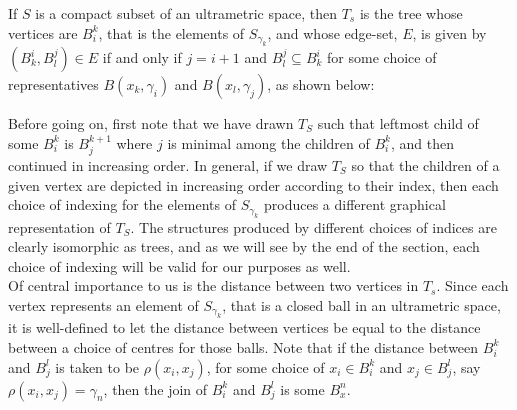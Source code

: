 \begin{definition}
If $S$ is a compact subset of an ultrametric space, then $T_s$ is the tree whose vertices are $B^k_i$, that is the elements of $S_{\gamma_k}$, and whose edge-set, $E$, is given by $ (B^i_k, B^j_l) \in E$ if and only if $ j = i+1$ and $B^j_l \subseteq B^i_k$ for some choice of representatives $B(x_k,\gamma_i)$ and $B(x_l, \gamma_j)$, as shown below:\\

\tikzset{font=\small,
level distance=1.75cm,
}

\begin{center}
\end{center}
\end{definition}

Before going on, first note that we have drawn $T_S$ such that leftmost child of some $B^k_i$ is $B^{k+1}_j$ where $j$ is minimal among the children of $B^k_i$, and then continued in increasing order. In general, if we draw $T_S$ so that the children of a given vertex are depicted in increasing order according to their index, then  each choice of indexing for the elements of $S_{\gamma_k}$ produces a different graphical representation of $T_S$. The structures produced by different choices of indices are clearly isomorphic as trees, and as we will see by the end of the section, each choice of indexing will be valid for our purposes as well.\\

Of central importance to us is the distance between two vertices in $T_s$. Since each vertex represents an element of $S_{\gamma_k}$, that is a closed ball in an ultrametric space, it is well-defined to let the distance between vertices be equal to the distance between a choice of centres for those balls. Note that if the distance between $B^k_i$ and $B^l_j$ is taken to be $\rho(x_i,x_j)$, for some choice of $x_i \in B^k_i$ and $x_j \in B^l_j$, say $\rho(x_i,x_j)=\gamma_n$, then the join of  $B^k_i$ and $B^l_j$ is some $B^n_x$.\\

